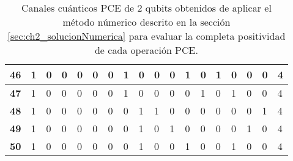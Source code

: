 \begin{table}[]
{\begin{tabular}{|P{0.6cm}|P{0.65cm}|P{0.65cm}|P{0.65cm}|P{0.65cm}|P{0.65cm}|P{0.65cm}|P{0.65cm}|P{0.65cm}|P{0.65cm}|P{0.65cm}|P{0.65cm}|P{0.65cm}|P{0.65cm}|P{0.65cm}|P{0.65cm}|P{0.65cm}|P{2.9cm}|}
\textbf{46}                        & 1                     & 0                     & 0                     & 0                     & 0                     & 0                     & 1                     & 0                     & 0                     & 0                     & 1                     & 0                     & 1                     & 0                     & 0                     & 0                     & 4                     \\ \hline
\textbf{47}                        & 1                     & 0                     & 0                     & 0                     & 0                     & 0                     & 1                     & 0                     & 0                     & 0                     & 0                     & 1                     & 0                     & 1                     & 0                     & 0                     & 4                     \\ \hline
\textbf{48}                        & 1                     & 0                     & 0                     & 0                     & 0                     & 0                     & 0                     & 1                     & 1                     & 0                     & 0                     & 0                     & 0                     & 0                     & 0                     & 1                     & 4                     \\ \hline
\textbf{49}                        & 1                     & 0                     & 0                     & 0                     & 0                     & 0                     & 0                     & 1                     & 0                     & 1                     & 0                     & 0                     & 0                     & 0                     & 1                     & 0                     & 4                     \\ \hline
\textbf{50}                        & 1                     & 0                     & 0                     & 0                     & 0                     & 0                     & 0                     & 1                     & 0                     & 0                     & 1                     & 0                     & 0                     & 1                     & 0                     & 0                     & 4                     \\ \hline
\end{tabular}
}
\caption{Canales cuánticos PCE de 2 qubits obtenidos de aplicar 
el método númerico descrito en la sección \ref{sec:ch2_solucionNumerica}
para evaluar la completa positividad de cada operación PCE.
}
\label{tab:2qubitsPCEChannel1sAnd0s}
\end{table}
